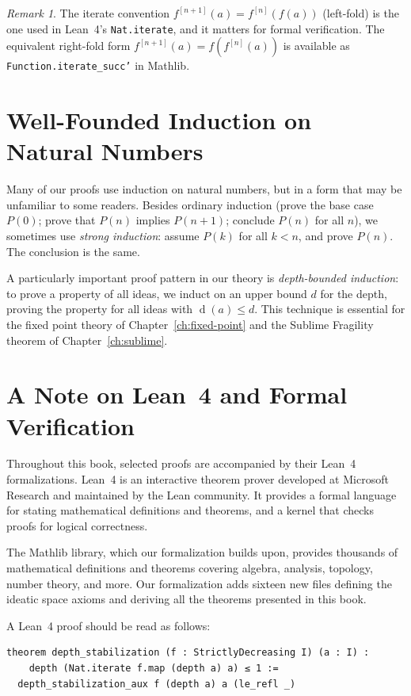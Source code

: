 \documentclass[11pt,openany]{book}
\theoremstyle{definition}
\theoremstyle{plain}
\theoremstyle{remark}
\newtheorem{remark}[axiom]{Remark}
\newcommand{\depth}{\operatorname{d}}       %
\begin{document}
\begin{remark}
The iterate convention $f^{[n+1]}(a) = f^{[n]}(f(a))$ (left-fold) is the one used in Lean~4's \texttt{Nat.iterate}, and it matters for formal verification. The equivalent right-fold form $f^{[n+1]}(a) = f(f^{[n]}(a))$ is available as \texttt{Function.iterate\_succ'} in Mathlib.
\end{remark}

\section{Well-Founded Induction on Natural Numbers}

Many of our proofs use induction on natural numbers, but in a form that may be unfamiliar to some readers. Besides ordinary induction (prove the base case $P(0)$; prove that $P(n)$ implies $P(n+1)$; conclude $P(n)$ for all $n$), we sometimes use \emph{strong induction}: assume $P(k)$ for all $k < n$, and prove $P(n)$. The conclusion is the same.

A particularly important proof pattern in our theory is \emph{depth-bounded induction}: to prove a property of all ideas, we induct on an upper bound $d$ for the depth, proving the property for all ideas with $\depth(a) \leq d$. This technique is essential for the fixed point theory of Chapter~\ref{ch:fixed-point} and the Sublime Fragility theorem of Chapter~\ref{ch:sublime}.

\section{A Note on Lean~4 and Formal Verification}

Throughout this book, selected proofs are accompanied by their Lean~4 formalizations. Lean~4 is an interactive theorem prover developed at Microsoft Research and maintained by the Lean community. It provides a formal language for stating mathematical definitions and theorems, and a kernel that checks proofs for logical correctness.

The Mathlib library, which our formalization builds upon, provides thousands of mathematical definitions and theorems covering algebra, analysis, topology, number theory, and more. Our formalization adds sixteen new files defining the ideatic space axioms and deriving all the theorems presented in this book.

A Lean~4 proof should be read as follows:

\begin{lstlisting}
theorem depth_stabilization (f : StrictlyDecreasing I) (a : I) :
    depth (Nat.iterate f.map (depth a) a) ≤ 1 :=
  depth_stabilization_aux f (depth a) a (le_refl _)
\end{lstlisting}
\end{document}
